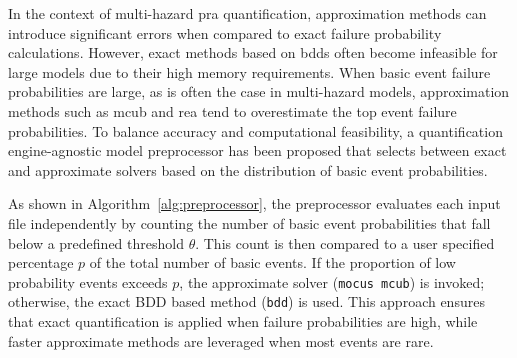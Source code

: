 



 In the context of multi-hazard \acrshort{pra} quantification, approximation methods can introduce significant errors when compared to exact failure probability calculations. However, exact methods based on \acrshort{bdd}s often become infeasible for large models due to their high memory requirements. When basic event failure probabilities are large, as is often the case in multi-hazard models, approximation methods such as \acrshort{mcub} and \acrshort{rea} tend to overestimate the top event failure probabilities. To balance accuracy and computational feasibility, a quantification engine-agnostic model preprocessor has been proposed that selects between exact and approximate solvers based on the distribution of basic event probabilities.



As shown in Algorithm~\ref{alg:preprocessor}, the preprocessor evaluates each input file independently by counting the number of basic event probabilities that fall below a predefined threshold $\theta$. This count is then compared to a user specified percentage $p$ of the total number of basic events. If the proportion of low probability events exceeds $p$, the approximate solver (\texttt{mocus mcub}) is invoked; otherwise, the exact BDD based method (\texttt{bdd}) is used. This approach ensures that exact quantification is applied when failure probabilities are high, while faster approximate methods are leveraged when most events are rare.